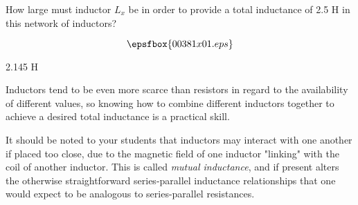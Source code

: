 

How large must inductor $L_x$ be in order to provide a total inductance of 2.5 H in this network of inductors?

$$\epsfbox{00381x01.eps}$$







2.145 H







Inductors tend to be even more scarce than resistors in regard to the availability of different values, so knowing how to combine different inductors together to achieve a desired total inductance is a practical skill.

It should be noted to your students that inductors may interact with one another if placed too close, due to the magnetic field of one inductor "linking" with the coil of another inductor.  This is called {\it mutual inductance}, and if present alters the otherwise straightforward series-parallel inductance relationships that one would expect to be analogous to series-parallel resistances.




